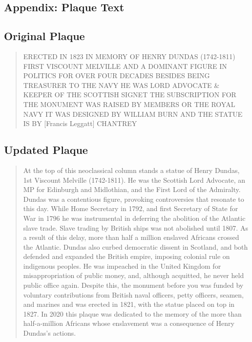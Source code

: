 \documentclass{scrartcl}
\begin{document}
\printbibliography

\begin{appendices}

\section{Appendix: Plaque Text}\label{sec:plaque-text}

\subsection{Original Plaque}\label{sec:original}

\begin{quote}
    ERECTED IN 1823 IN MEMORY OF HENRY DUNDAS (1742-1811)
FIRST VISCOUNT MELVILLE AND A DOMINANT FIGURE IN POLITICS FOR OVER FOUR DECADES BESIDES BEING TREASURER TO THE NAVY HE WAS LORD ADVOCATE \& KEEPER OF THE SCOTTISH SIGNET THE SUBSCRIPTION FOR THE MONUMENT WAS RAISED BY MEMBERS OR THE ROYAL NAVY
IT WAS DESIGNED BY WILLIAM BURN AND THE STATUE IS BY [Francis Leggatt] CHANTREY
\end{quote}

\subsection{Updated Plaque}\label{sec:reworded}

\begin{quote}
    {At the top of this neoclassical column stands a statue of Henry Dundas, 1st Viscount Melville (1742-1811). He was the Scottish Lord Advocate, an MP for Edinburgh and Midlothian, and the First Lord of the Admiralty. Dundas was a contentious figure, provoking controversies that resonate to this day. While Home Secretary in 1792, and first Secretary of State for War in 1796 he was instrumental in deferring the abolition of the Atlantic slave trade. Slave trading by British ships was not abolished until 1807. As a result of this delay, more than half a million enslaved Africans crossed the Atlantic. Dundas also curbed democratic dissent in Scotland, and both defended and expanded the British empire, imposing colonial rule on indigenous peoples. He was impeached in the United Kingdom for misappropriation of public money, and, although acquitted, he never held public office again. Despite this, the monument before you was funded by voluntary contributions from British naval officers, petty officers, seamen, and marines
and was erected in 1821, with the statue placed on top in 1827. In 2020 this plaque was dedicated to the memory of the more than half-a-million Africans
whose enslavement was a consequence of Henry Dundas's actions.}
\end{quote}


\end{appendices}
\end{document}

